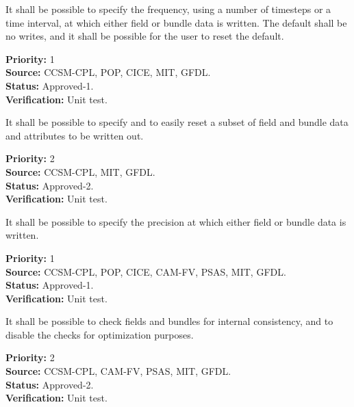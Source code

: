 It shall be possible to specify the frequency, using a number of timesteps 
or a time interval, at which either field or bundle data is written.  The
default shall be no writes, and it shall be possible for the user
to reset the default.
\begin{reqlist}
{\bf Priority:} 1 \\
{\bf Source:} CCSM-CPL, POP, CICE, MIT, GFDL. \\
{\bf Status:} Approved-1. \\
{\bf Verification:} Unit test. 
\end{reqlist}

It shall be possible to specify and to easily reset a 
subset of field and bundle data and attributes to be written out.
\begin{reqlist}
{\bf Priority:} 2 \\
{\bf Source:} CCSM-CPL, MIT, GFDL. \\
{\bf Status:} Approved-2. \\
{\bf Verification:} Unit test. 
\end{reqlist}

It shall be possible to specify the precision at which either field or 
bundle data is written.
\begin{reqlist}
{\bf Priority:} 1 \\
{\bf Source:} CCSM-CPL, POP, CICE, CAM-FV, PSAS, MIT, GFDL. \\
{\bf Status:} Approved-1. \\
{\bf Verification:} Unit test. 
\end{reqlist}


It shall be possible to check fields and bundles for internal consistency,
and to disable the checks for optimization purposes.
\begin{reqlist}
{\bf Priority:} 2\\
{\bf Source:} CCSM-CPL, CAM-FV, PSAS, MIT, GFDL.  \\
{\bf Status:} Approved-2. \\
{\bf Verification:} Unit test. 
\end{reqlist}





















